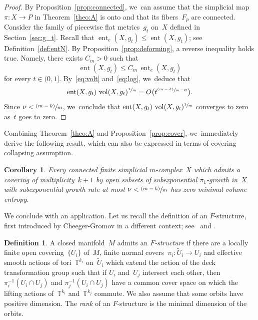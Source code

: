 \documentclass[11pt]{article}
\let\oldsfrac\sfrac
\renewcommand{\sfrac}[2]{{\oldsfrac{#1}{#2}}}
\newcommand{\psfrac}[2]{\sfrac{(#1)}{#2}}
\newtheorem{corollary}[theorem]{Corollary}
\theoremstyle{definition}
\newtheorem{definition}[theorem]{Definition}
\newcommand\T{{\mathbb T}}
\DeclareMathOperator{\ent}{ent}\let\eent\ent
\DeclareMathOperator{\vol}{vol}
\numberwithin{equation}{section}
\begin{document}
\begin{proof}
By Proposition~\ref{prop:connected}, we~can assume that the simplicial map $\pi:X \to P$ in Theorem~\ref{theo:A} is onto and that its fibers~$F_p$ are connected.
Consider the family of piecewise flat metrics~$g_t$ on~$X$ defined in Section~\ref{sec:g_t}.
Recall that $\ent_e(X,g_t) \leq \ent(X,g_t)$; see Definition~\ref{def:entN}.
By Proposition~\ref{prop:deforming}, a reverse inequality holds true.
Namely, there exists $C_m >0$ such that
\begin{equation*} %
\ent(X,g_t) \leq C_m \, \ent_e(X,g_t)
\end{equation*}
for every $t \in (0,1]$.
By~\eqref{eq:volt} and~\eqref{eq:log}, we~deduce that
\[
\eent(X,g_t) \, \vol(X,g_t)^\sfrac{1}{m} = O \bigl(t^{\psfrac{m-k}{m} - \nu} \bigr).
\]
Since $\nu < \psfrac{m-k}{m}$, we~conclude that $\eent(X,g_t) \, \vol(X,g_t)^\sfrac{1}{m}$ converges to zero as~$t$ goes to zero.
\end{proof}

Combining Theorem~\ref{theo:A} and Proposition~\ref{prop:cover}, we~immediately derive the following result, which can also be expressed in terms of covering collapsing assumption.

\begin{corollary}\label{coro:collapsing}
Every connected finite simplicial $m$\nobreakdash-complex~$X$ which admits a covering of multiplicity~$k+1$ by open subsets of subexponential $\pi_1$-growth in~$X$ with subexponential growth rate at most $\nu < \psfrac{m-k}{m}$ has zero minimal volume entropy.
\end{corollary}

We conclude with an application.
Let us recall the definition of an $F$-structure, first introduced by Cheeger-Gromov in a different context; see~\cite{ChG} and \cite{ChGbis}.

\begin{definition} \label{def:F-structure}
A closed manifold~$M$ admits an \emph{$F$-structure} if there are a locally finite open covering~$\{U_i\}$ of~$M$, finite normal covers~$\pi_i:\tilde{U}_i \to U_i$ and effective smooth actions of tori~$\T^{k_i}$ on~$\tilde{U}_i$ which extend the action of the deck transformation group such that if $U_i$ and~$U_j$ intersect each other, then $\pi_i^{-1}(U_i \cap U_j)$ and $\pi_j^{-1}(U_i \cap U_j)$ have a common cover space on which the lifting actions of~$\T^{k_i}$ and~$\T^{k_j}$ commute.
We also assume that some orbits have positive dimension.
The \emph{rank} of an $F$-structure is the minimal dimension of the orbits.
\end{definition}
\end{document}
